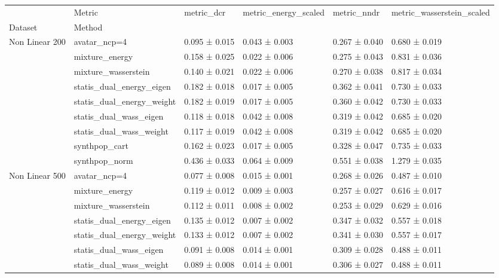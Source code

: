 \begin{tabular}{llllll}
\toprule
 & Metric & metric_dcr & metric_energy_scaled & metric_nndr & metric_wasserstein_scaled \\
Dataset & Method &  &  &  &  \\
\midrule
\multirow[t]{9}{*}{Non Linear 200} & avatar_ncp=4 & \cellcolor{mygreen}0.095 ± 0.015 & 0.043 ± 0.003 & \cellcolor{mygreen}0.267 ± 0.040 & \cellcolor{mygreen}0.680 ± 0.019 \\
 & mixture_energy & 0.158 ± 0.025 & 0.022 ± 0.006 & 0.275 ± 0.043 & 0.831 ± 0.036 \\
 & mixture_wasserstein & 0.140 ± 0.021 & 0.022 ± 0.006 & 0.270 ± 0.038 & 0.817 ± 0.034 \\
 & statis_dual_energy_eigen & 0.182 ± 0.018 & \cellcolor{mygreen}0.017 ± 0.005 & 0.362 ± 0.041 & 0.730 ± 0.033 \\
 & statis_dual_energy_weight & 0.182 ± 0.019 & \cellcolor{mygreen}0.017 ± 0.005 & 0.360 ± 0.042 & 0.730 ± 0.033 \\
 & statis_dual_wass_eigen & 0.118 ± 0.018 & 0.042 ± 0.008 & 0.319 ± 0.042 & 0.685 ± 0.020 \\
 & statis_dual_wass_weight & 0.117 ± 0.019 & 0.042 ± 0.008 & 0.319 ± 0.042 & 0.685 ± 0.020 \\
 & synthpop_cart & 0.162 ± 0.023 & \cellcolor{mygreen}0.017 ± 0.005 & 0.328 ± 0.047 & 0.735 ± 0.033 \\
 & synthpop_norm & \cellcolor{myred}0.436 ± 0.033 & \cellcolor{myred}0.064 ± 0.009 & \cellcolor{myred}0.551 ± 0.038 & \cellcolor{myred}1.279 ± 0.035 \\
\cline{1-6}
\multirow[t]{9}{*}{Non Linear 500} & avatar_ncp=4 & \cellcolor{mygreen}0.077 ± 0.008 & 0.015 ± 0.001 & 0.268 ± 0.026 & \cellcolor{mygreen}0.487 ± 0.010 \\
 & mixture_energy & 0.119 ± 0.012 & 0.009 ± 0.003 & 0.257 ± 0.027 & 0.616 ± 0.017 \\
 & mixture_wasserstein & 0.112 ± 0.011 & 0.008 ± 0.002 & \cellcolor{mygreen}0.253 ± 0.029 & 0.629 ± 0.016 \\
 & statis_dual_energy_eigen & 0.135 ± 0.012 & \cellcolor{mygreen}0.007 ± 0.002 & 0.347 ± 0.032 & 0.557 ± 0.018 \\
 & statis_dual_energy_weight & 0.133 ± 0.012 & \cellcolor{mygreen}0.007 ± 0.002 & 0.341 ± 0.030 & 0.557 ± 0.017 \\
 & statis_dual_wass_eigen & 0.091 ± 0.008 & 0.014 ± 0.001 & 0.309 ± 0.028 & 0.488 ± 0.011 \\
 & statis_dual_wass_weight & 0.089 ± 0.008 & 0.014 ± 0.001 & 0.306 ± 0.027 & 0.488 ± 0.011 \\

\end{tabular}
